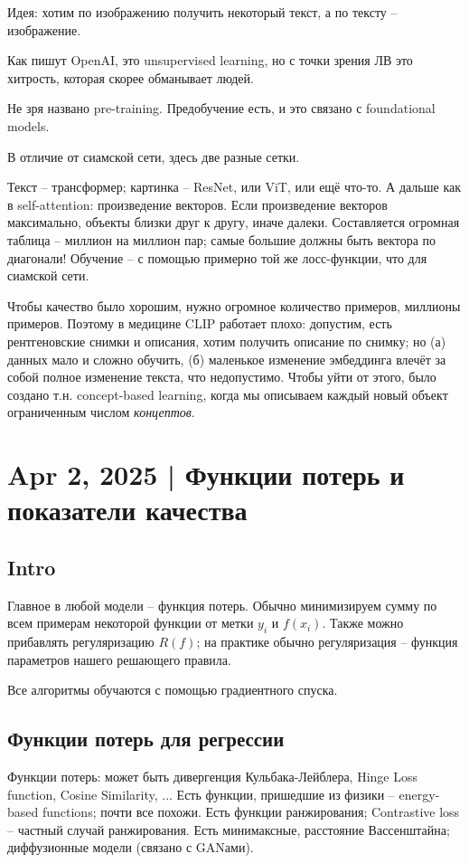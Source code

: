 \documentclass[a4paper,12pt]{article}
\begin{document}
Идея: хотим по изображению получить некоторый текст, а по тексту -- изображение.

Как пишут OpenAI, это unsupervised learning, но с точки зрения ЛВ это хитрость, которая скорее обманывает людей.

Не зря названо pre-training.
Предобучение есть, и это связано с foundational models.

В отличие от сиамской сети, здесь две разные сетки.

Текст -- трансформер; картинка -- ResNet, или ViT, или ещё что-то.
А дальше как в self-attention: произведение векторов.
Если произведение векторов максимально, объекты близки друг к другу, иначе далеки.
Составляется огромная таблица -- миллион на миллион пар; самые большие должны быть вектора по диагонали!
Обучение -- с помощью примерно той же лосс-функции, что для сиамской сети.

Чтобы качество было хорошим, нужно огромное количество примеров, миллионы примеров.
Поэтому в медицине CLIP работает плохо: допустим, есть рентгеновские снимки и описания, хотим получить описание по снимку; но (а) данных мало и сложно обучить, (б) маленькое изменение эмбеддинга влечёт за собой полное изменение текста, что недопустимо.
Чтобы уйти от этого, было создано т.н. concept-based learning, когда мы описываем каждый новый объект ограниченным числом \emph{концептов}.

\section{Apr 2, 2025 | Функции потерь и показатели качества}
\subsection{Intro}

Главное в любой модели -- функция потерь.
Обычно минимизируем сумму по всем примерам некоторой функции от метки $y_i$ и $ f(x_i) $.
Также можно прибавлять регуляризацию $ R(f) $; на практике обычно регуляризация -- функция параметров нашего решающего правила.

Все алгоритмы обучаются с помощью градиентного спуска.

\subsection{Функции потерь для регрессии}

Функции потерь: может быть дивергенция Кульбака-Лейблера, Hinge Loss function, Cosine Similarity, ...
Есть функции, пришедшие из физики -- energy-based functions; почти все похожи.
Есть функции ранжирования; Contrastive loss -- частный случай ранжирования.
Есть минимаксные, расстояние Вассенштайна; диффузионные модели (связано с GANами).
\end{document}
